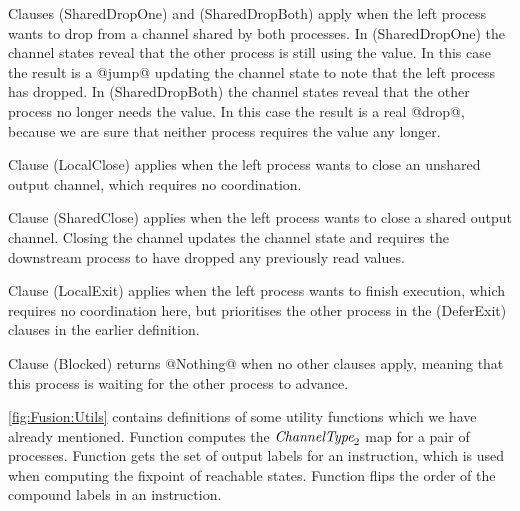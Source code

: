Clauses (SharedDropOne) and (SharedDropBoth) apply when the left process wants to drop from a channel shared by both processes. In (SharedDropOne) the channel states reveal that the other process is still using the value. In this case the result is a @jump@ updating the channel state to note that the left process has dropped. In (SharedDropBoth) the channel states reveal that the other process no longer needs the value. In this case the result is a real @drop@, because we are sure that neither process requires the value any longer.

Clause (LocalClose) applies when the left process wants to close an unshared output channel, which requires no coordination.

Clause (SharedClose) applies when the left process wants to close a shared output channel.
Closing the channel updates the channel state and requires the downstream process to have dropped any previously read values.

Clause (LocalExit) applies when the left process wants to finish execution, which requires no coordination here, but prioritises the other process in the (DeferExit) clauses in the earlier  definition.

Clause (Blocked) returns @Nothing@ when no other clauses apply, meaning that this process is waiting for the other process to advance.




\smallskip
\autoref{fig:Fusion:Utils} contains definitions of some utility functions which we have already mentioned.
Function  computes the $\textit{ChannelType}_2$ map for a pair of processes.
Function  gets the set of output labels for an instruction, which is used when computing the fixpoint of reachable states.
Function  flips the order of the compound labels in an instruction.


